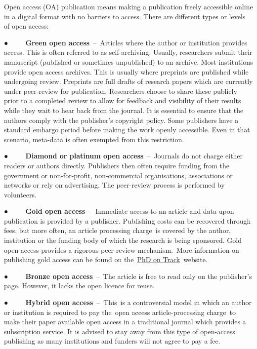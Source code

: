 \documentclass[
]{book}
\begin{document}
Open access (OA) publication means making a publication freely accessible online in a digital format with no barriers to access. There are different types or levels of open access:

● ~ ~ ~\textbf{Green open access}~--~Articles where the author or institution provides access. This is often referred to as self-archiving. Usually, researchers submit their manuscript (published or sometimes unpublished) to an archive. Most institutions provide open access archives. This is usually where preprints are published while undergoing review. Preprints are full drafts of research papers which are currently under peer-review for publication. Researchers choose to share these publicly prior to a completed review to allow for feedback and visibility of their results while they wait to hear back from the journal. It is essential to ensure that the authors comply with the publisher's copyright policy. Some publishers have a standard embargo period before making the work openly accessible. Even in that scenario, meta-data is often exempted from this restriction.

● ~ ~ ~\textbf{Diamond or platinum open access}~--~Journals do not charge either readers or authors directly. Publishers then often require funding from the government or non-for-profit, non-commercial organisations, associations or networks or rely on advertising. The peer-review process is performed by volunteers.

● ~ ~ ~\textbf{Gold open access}~--~Immediate access to an article and data upon publication is provided by a publisher. Publishing costs can be recovered through fees, but more often, an article processing charge~is covered by the author, institution or the funding body of which the research is being sponsored. Gold open access provides a rigorous peer review mechanism.~More information on publishing gold access can be found on the~\href{https://www.phdontrack.net/open-science/open-access-publishing/\#toc3}{PhD on Track}~website.

● ~ ~ ~\textbf{Bronze open access}~--~The article is free to read only on the publisher's page. However, it lacks the open licence for reuse.

● ~ ~ ~\textbf{Hybrid open access}~--~This~is a controversial model in which an author or institution is required to pay the~open access article-processing charge~to make their paper available open access in a traditional journal which provides a subscription service. It is advised to stay away from this type of open-access publishing as many institutions and funders will not agree to pay a fee.
\end{document}
